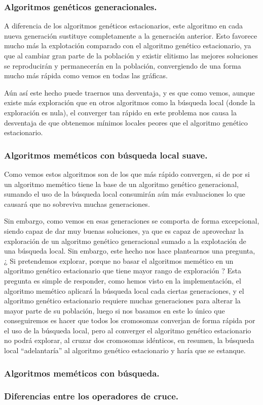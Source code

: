 \documentclass[12pt, spanish]{article}
\begin{document}
\subsubsection{Algoritmos genéticos generacionales.}

A diferencia de los algoritmos genéticos estacionarios, este algoritmo en cada nueva generación sustituye completamente a la generación anterior. Esto favorece mucho más la explotación comparado con el algoritmo genético estacionario, ya que al cambiar gran parte de la población y existir elitismo las mejores soluciones se reproducirán y permanecerán en la población, convergiendo de una forma mucho más rápida como vemos en todas las gráficas.

Aún así este hecho puede traernos una desventaja, y es que como vemos, aunque existe más exploración que en otros algoritmos como la búsqueda local (donde la exploración es nula), el converger tan rápido en este problema nos causa la desventaja de que obtenemos mínimos locales peores que el algoritmo genético estacionario.

\newpage

\subsubsection{Algoritmos meméticos con búsqueda local suave.}

Como vemos estos algoritmos son de los que más rápido convergen, si de por si un algoritmo memético tiene la base de un algoritmo genético generacional, sumando el uso de la búsqueda local consumirán aún más evaluaciones lo que causará que no sobreviva muchas generaciones.

Sin embargo, como vemos en esas generaciones se comporta de forma excepcional, siendo capaz de dar muy buenas soluciones, ya que es capaz de aprovechar la exploración de un algoritmo genético generacional sumado a la explotación de una búsqueda local. Sin embargo, este hecho nos hace plantearnos una pregunta, ¿ Si pretendemos explorar, porque no basar el algoritmos memético en un algoritmo genético estacionario que tiene mayor rango de exploración ? Esta pregunta es simple de responder, como hemos visto en la implementación, el algoritmo memético aplicará la búsqueda local cada ciertas generaciones, y el algoritmo genético estacionario requiere muchas generaciones para alterar la mayor parte de su población, luego si nos basamos en este lo único que conseguiremos es hacer que todos los cromosomas converjan de forma rápida por el uso de la búsqueda local, pero al converger el algoritmo genético estacionario no podrá explorar, al cruzar dos cromosomas idénticos, en resumen, la búsqueda local ``adelantaría'' al algoritmo genético estacionario y haría que se estanque.

\subsubsection{Algoritmos meméticos con búsqueda.}

\subsubsection{Diferencias entre los operadores de cruce.}
\end{document}
